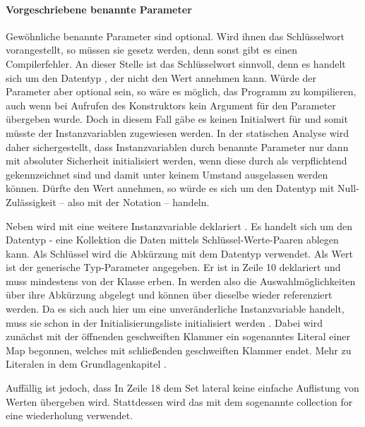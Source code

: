 \paragraph{Vorgeschriebene benannte Parameter}

Gewöhnliche benannte Parameter sind optional.
Wird ihnen das Schlüsselwort  vorangestellt, so müssen sie gesetz werden, denn sonst gibt es einen Compilerfehler.
An dieser Stelle ist das  Schlüsselwort sinnvoll, denn es handelt sich um den Datentyp , der nicht den Wert  annehmen kann.
Würde der Parameter aber optional sein, so wäre es möglich, das Programm zu kompilieren, auch wenn bei Aufrufen des Konstruktors kein Argument für den Parameter übergeben wurde.
Doch in diesem Fall gäbe es keinen Initialwert für  und somit müsste der Instanzvariablen  zugewiesen werden.
In der statischen Analyse wird daher sichergestellt, dass Instanzvariablen durch benannte Parameter nur dann mit absoluter Sicherheit initialisiert werden, wenn diese durch   als verpflichtend gekennzeichnet sind und damit unter keinem Umstand ausgelassen werden können. 
Dürfte  den Wert  annehmen, so würde es sich um den Datentyp  mit Null-Zulässigkeit -- also mit der Notation  -- handeln.

Neben  wird mit  eine weitere Instanzvariable deklariert .
Es handelt sich um den Datentyp  - eine Kollektion die Daten mittels Schlüssel-Werte-Paaren ablegen kann.
Als Schlüssel wird die Abkürzung mit dem Datentyp  verwendet.
Als Wert ist der generische Typ-Parameter  angegeben.
Er ist in Zeile 10 deklariert und muss mindestens von der Klasse  erben.
In  werden also die Auswahlmöglichkeiten über  ihre Abkürzung abgelegt und können über dieselbe wieder referenziert werden.
 Da es sich auch hier um eine unveränderliche Instanzvariable handelt, muss sie schon in der Initialisierungsliste initialisiert werden .
Dabei wird zunächst mit der öffnenden geschweiften Klammer  ein sogenanntes Literal einer Map  begonnen, welches mit schließenden geschweiften Klammer  endet.
Mehr zu  Literalen in dem Grundlagenkapitel .



Auffällig ist jedoch, dass In Zeile 18 dem Set lateral keine einfache Auflistung von Werten übergeben wird.
Stattdessen wird das mit dem sogenannte collection for eine wiederholung verwendet.



